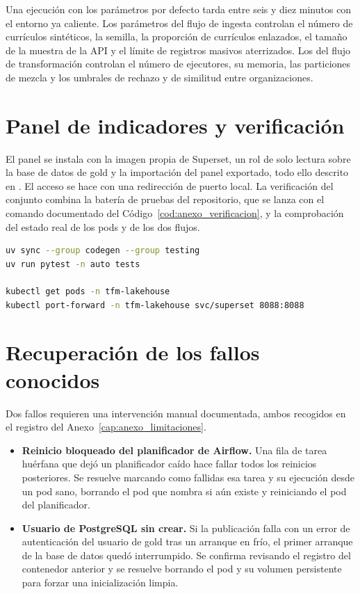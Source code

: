 Una ejecución con los parámetros por defecto tarda entre seis y diez
minutos con el entorno ya caliente. Los parámetros del flujo de ingesta
controlan el número de currículos sintéticos, la semilla, la proporción de
currículos enlazados, el tamaño de la muestra de la API y el límite de
registros masivos aterrizados. Los del flujo de transformación controlan el
número de ejecutores, su memoria, las particiones de mezcla y los umbrales
de rechazo y de similitud entre organizaciones.

\section{Panel de indicadores y verificación}
\label{sec:anexo_reproduccion_panel}

El panel se instala con la imagen propia de Superset, un rol de solo lectura
sobre la base de datos de gold y la importación del panel exportado, todo
ello descrito en . El acceso se hace con una
redirección de puerto local. La verificación del conjunto combina la batería
de pruebas del repositorio, que se lanza con el comando documentado del
Código~\ref{cod:anexo_verificacion}, y la comprobación del estado real de
los pods y de los dos flujos.

\begin{code}[H]
\begin{lstlisting}[language=bash, basicstyle=\footnotesize\ttfamily, breaklines=true]
uv sync --group codegen --group testing
uv run pytest -n auto tests

kubectl get pods -n tfm-lakehouse
kubectl port-forward -n tfm-lakehouse svc/superset 8088:8088
\end{lstlisting}
\caption{Verificación del repositorio y del estado del clúster.}
\label{cod:anexo_verificacion}
\end{code}

\section{Recuperación de los fallos conocidos}
\label{sec:anexo_reproduccion_recuperacion}

Dos fallos requieren una intervención manual documentada, ambos recogidos en
el registro del Anexo~\ref{cap:anexo_limitaciones}.

\begin{itemize}
  \item \textbf{Reinicio bloqueado del planificador de Airflow.} Una fila de
  tarea huérfana que dejó un planificador caído hace fallar todos los reinicios
  posteriores. Se resuelve marcando como fallidas esa tarea y su ejecución
  desde un pod sano, borrando el pod que nombra si aún existe y reiniciando el
  pod del planificador.
  \item \textbf{Usuario de PostgreSQL sin crear.} Si la publicación falla
  con un error de autenticación del usuario de gold tras un arranque en
  frío, el primer arranque de la base de datos quedó interrumpido. Se
  confirma revisando el registro del contenedor anterior y se resuelve
  borrando el pod y su volumen persistente para forzar una inicialización
  limpia.
\end{itemize}
